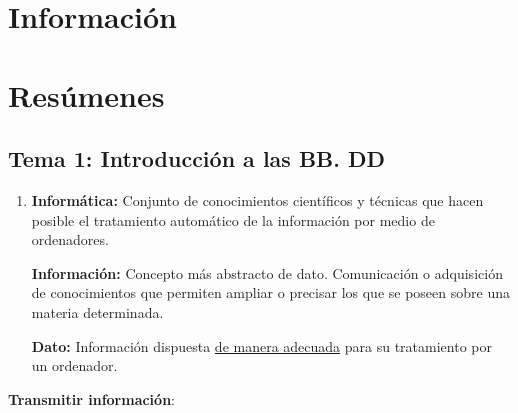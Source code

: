 \documentclass[12pt, twoside, openright]{report} %
\begin{document}






\part{Información}


\part{Resúmenes}


  \chapter{Tema 1: Introducción a las BB. DD}

  \begin{enumerate}
  \item \textbf{Informática:} Conjunto de conocimientos científicos y
    técnicas que hacen posible el tratamiento automático de la
    información por medio de ordenadores.
    

    \textbf{Información:} Concepto más abstracto de dato. Comunicación o
    adquisición de conocimientos que permiten ampliar o precisar los que
    se poseen sobre una materia determinada.
    

    \textbf{Dato:} Información dispuesta \underline{de manera adecuada}
    para su tratamiento por un ordenador.
    
  \end{enumerate}

  \textbf{Transmitir información}:
\end{document}
